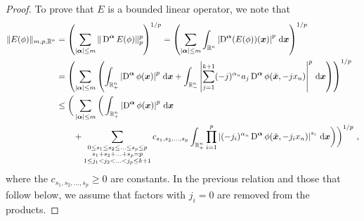 \begin{proof}
To prove that $E$ is a bounded linear operator, we note that
\begin{align*}
\| E(\phi) \|_{m,p,\mathbb{R}^n} &= \left( \sum_{|{\bm{\alpha}}|\leq m}
\|\operatorname{D}^{{\bm{\alpha}}} E(\phi)\|_p^p \right)^{1/p}
= \left( \sum_{|{\bm{\alpha}}|\leq m} \int_{\mathbb{R}^n}
\left|\operatorname{D}^{{\bm{\alpha}}} (E(\phi))({\bm{x}}) \right|^p
\,\mathrm{d}{{\bm{x}}} \right)^{1/p} \\
&= \left( \sum_{|{\bm{\alpha}}|\leq m} \left( \int_{\mathbb{R}^n_+}
\left|\operatorname{D}^{{\bm{\alpha}}} \phi({\bm{x}}) \right|^p \,\mathrm{d}{{\bm{x}}}
+ \int_{\mathbb{R}^n_-} \left|\sum_{j=1}^{k+1} (-j)^{\alpha_n} a_j
\operatorname{D}^{{\bm{\alpha}}} \phi(\breve{{\bm{x}}},-j x_n)\right|^p \,\mathrm{d}{{\bm{x}}}
\right) \right)^{1/p} \\
&\leq \bigg( \sum_{|{\bm{\alpha}}|\leq m} \bigg( \int_{\mathbb{R}^n_+}
\left|\operatorname{D}^{{\bm{\alpha}}} \phi({\bm{x}}) \right|^p \,\mathrm{d}{{\bm{x}}} \\
&\qquad + \sum_{\substack{0\leq s_1 \leq s_2 \leq \ldots \leq s_p \leq p\\
  s_1+s_2+\ldots+s_p = p\\
  1\leq j_1 < j_2 < \ldots <j_p \leq k+1}} c_{s_1,s_2,\ldots,s_p}
  \int_{\mathbb{R}^n_+} \prod_{i=1}^p \left| (-j_i)^{\alpha_n} \operatorname{D}^{{\bm{\alpha}}}
\phi(\breve{{\bm{x}}},-j_i x_n)\right|^{s_i} \,\mathrm{d}{{\bm{x}}}
\bigg) \bigg)^{1/p} \ ,
\end{align*}
where the $c_{s_1,s_2,\ldots,s_p} \geq 0$ are constants.
In the previous relation and those that follow below, we assume that
factors with $j_i=0$ are removed from the products.


\end{proof}
